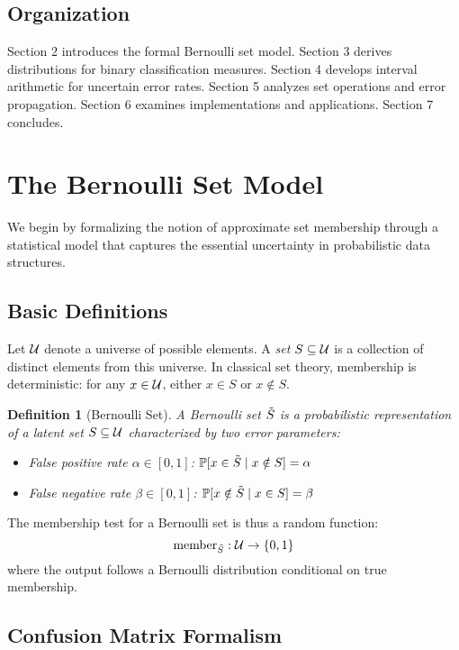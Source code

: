 \documentclass[11pt]{article}
\newtheorem{definition}[theorem]{Definition}
\begin{document}
\subsection{Organization}

Section 2 introduces the formal Bernoulli set model. Section 3 derives distributions for binary classification measures. Section 4 develops interval arithmetic for uncertain error rates. Section 5 analyzes set operations and error propagation. Section 6 examines implementations and applications. Section 7 concludes.

\section{The Bernoulli Set Model}
\label{sec:model}

We begin by formalizing the notion of approximate set membership through a statistical model that captures the essential uncertainty in probabilistic data structures.

\subsection{Basic Definitions}

Let $\mathcal{U}$ denote a universe of possible elements. A \emph{set} $S \subseteq \mathcal{U}$ is a collection of distinct elements from this universe. In classical set theory, membership is deterministic: for any $x \in \mathcal{U}$, either $x \in S$ or $x \notin S$.

\begin{definition}[Bernoulli Set]
A \emph{Bernoulli set} $\tilde{S}$ is a probabilistic representation of a latent set $S \subseteq \mathcal{U}$ characterized by two error parameters:
\begin{itemize}
\item False positive rate $\alpha \in [0,1]$: $\mathbb{P}[x \in \tilde{S} \mid x \notin S] = \alpha$
\item False negative rate $\beta \in [0,1]$: $\mathbb{P}[x \notin \tilde{S} \mid x \in S] = \beta$
\end{itemize}
\end{definition}

The membership test for a Bernoulli set is thus a random function:
\[
\text{member}_{\tilde{S}}: \mathcal{U} \rightarrow \{0,1\}
\]
where the output follows a Bernoulli distribution conditional on true membership.

\subsection{Confusion Matrix Formalism}
\end{document}
